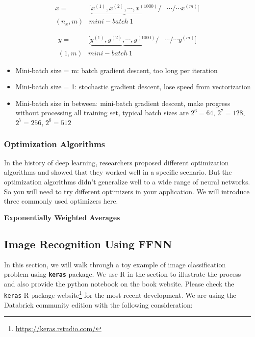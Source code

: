 \documentclass[12pt,]{krantz}
\providecommand{\tightlist}{%
  \setlength{\itemsep}{0pt}\setlength{\parskip}{0pt}}
\renewcommand{\href}[2]{#2\footnote{\url{#1}}}
\begin{document}
\[\begin{array}{ccc} x= & [\underbrace{x^{(1)},x^{(2)},\cdots,x^{(1000)}}/ & \cdots/\cdots x^{(m)}]\\ (n_{x},m) & mini-batch\ 1 \end{array}\]

\[\begin{array}{ccc} y= & [\underbrace{y^{(1)},y^{(2)},\cdots,y^{(1000)}}/ & \cdots/\cdots y^{(m)}]\\ (1,m) & mini-batch\ 1 \end{array}\]

\begin{itemize}
\tightlist
\item
  Mini-batch size = m: batch gradient descent, too long per iteration
\item
  Mini-batch size = 1: stochastic gradient descent, lose speed from vectorization
\item
  Mini-batch size in between: mini-batch gradient descent, make progress without processing all training set, typical batch sizes are \(2^6=64\), \(2^7=128\), \(2^7=256\), \(2^8=512\)
\end{itemize}

\hypertarget{optimization-algorithms}{%
\subsubsection{Optimization Algorithms}\label{optimization-algorithms}}

In the history of deep learning, researchers proposed different optimization algorithms and showed that they worked well in a specific scenario. But the optimization algorithms didn't generalize well to a wide range of neural networks. So you will need to try different optimizers in your application. We will introduce three commonly used optimizers here.

\textbf{Exponentially Weighted Averages}

\hypertarget{image-recognition-using-ffnn}{%
\subsection{Image Recognition Using FFNN}\label{image-recognition-using-ffnn}}

In this section, we will walk through a toy example of image classification problem using \textbf{\texttt{keras}} package. We use R in the section to illustrate the process and also provide the python notebook on the book website. Please check the \href{https://keras.rstudio.com/}{\texttt{keras} R package website} for the most recent development. We are using the Databrick community edition with the following consideration:
\end{document}
